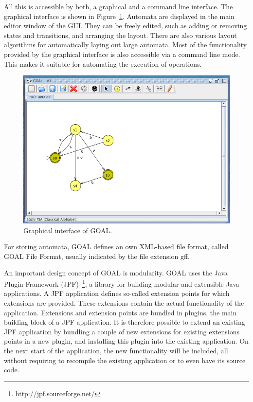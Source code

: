 All this is accessible by both, a graphical and a command line interface. The graphical interface is shown in Figure~\ref{goal_gui}. Automata are displayed in the main editor window of the GUI. They can be freely edited, such as adding or removing states and transitions, and arranging the layout. There are also various layout algorithms for automatically laying out large automata. Most of the functionality provided by the graphical interface is also accessible via a command line mode. This makes it suitable for automating the execution of operations.

\begin{figure}
\begin{center}
\includegraphics[scale=0.5]{figures/goal_gui.png}
\caption{Graphical interface of GOAL.}
\label{goal_gui}
\end{center}
\end{figure} 

For storing automata, GOAL defines an own XML-based file format, called GOAL File Format, usually indicated by the file extension gff.

An important design concept of GOAL is modularity. GOAL uses the Java Plugin Framework (JPF)~\footnote{http://jpf.sourceforge.net/}, a library for building modular and extensible Java applications. A JPF application defines so-called extension points for which extensions are provided. These extensions contain the actual functionality of the application. Extensions and extension points are bundled in plugins, the main building block of a JPF application. It is therefore possible to extend an existing JPF application by bundling a couple of new extensions for existing extensions points in a new plugin, and installing this plugin into the existing application. On the next start of the application, the new functionality will be included, all without requiring to recompile the existing application or to even have its source code.

